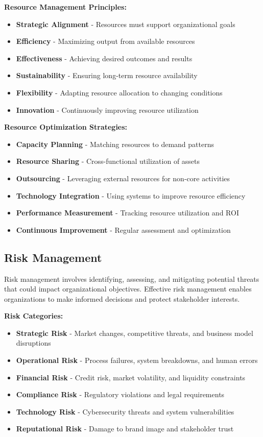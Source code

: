 \documentclass[12pt]{article}
\begin{document}
\textbf{Resource Management Principles:}
\begin{itemize}
    \item \textbf{Strategic Alignment} - Resources must support organizational goals
    \item \textbf{Efficiency} - Maximizing output from available resources
    \item \textbf{Effectiveness} - Achieving desired outcomes and results
    \item \textbf{Sustainability} - Ensuring long-term resource availability
    \item \textbf{Flexibility} - Adapting resource allocation to changing conditions
    \item \textbf{Innovation} - Continuously improving resource utilization
\end{itemize}

\textbf{Resource Optimization Strategies:}
\begin{itemize}
    \item \textbf{Capacity Planning} - Matching resources to demand patterns
    \item \textbf{Resource Sharing} - Cross-functional utilization of assets
    \item \textbf{Outsourcing} - Leveraging external resources for non-core activities
    \item \textbf{Technology Integration} - Using systems to improve resource efficiency
    \item \textbf{Performance Measurement} - Tracking resource utilization and ROI
    \item \textbf{Continuous Improvement} - Regular assessment and optimization
\end{itemize}

\subsection{Risk Management}
Risk management involves identifying, assessing, and mitigating potential threats that could impact organizational objectives. Effective risk management enables organizations to make informed decisions and protect stakeholder interests.

\textbf{Risk Categories:}
\begin{itemize}
    \item \textbf{Strategic Risk} - Market changes, competitive threats, and business model disruptions
    \item \textbf{Operational Risk} - Process failures, system breakdowns, and human errors
    \item \textbf{Financial Risk} - Credit risk, market volatility, and liquidity constraints
    \item \textbf{Compliance Risk} - Regulatory violations and legal requirements
    \item \textbf{Technology Risk} - Cybersecurity threats and system vulnerabilities
    \item \textbf{Reputational Risk} - Damage to brand image and stakeholder trust
\end{itemize}
\end{document}
